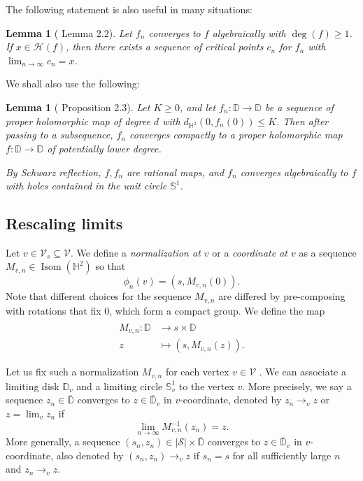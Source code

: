 \documentclass[11pt, reqno]{amsart}
\numberwithin{equation}{section}
\theoremstyle{plain}
\theoremstyle{theorem}
\newtheorem{lem}[theorem]{Lemma}
\theoremstyle{definition}
\newcommand{\Hyp}{\mathbb{H}}
\newcommand{\D}{\mathbb{D}}
\DeclareMathOperator{\Isom}{Isom}
\numberwithin{figure}{section}
\begin{document}
The following statement is also useful in many situations:
\begin{lem}[\cite{Luo21} Lemma 2.2]\label{lem:critc}
Let $f_n$ converges to $f$ algebraically with $\deg(f) \geq 1$.
If $x\in \mathcal{H}(f)$, then there exists a sequence of critical points $c_n$ for $f_n$ with $\lim_{n\to\infty}c_n = x$.
\end{lem}

We shall also use the following:
\begin{lem}[\cite{Luo21} Proposition 2.3]\label{lem:ac1}
Let $K \geq 0$, and let $f_n: \D\longrightarrow \D$ be a sequence of proper holomorphic map of degree $d$ with $d_{\Hyp^2}(0, f_n(0)) \leq K$.
Then after passing to a subsequence, $f_n$ converges compactly to a proper holomorphic map $f: \D \longrightarrow \D$ of potentially lower degree.

By Schwarz reflection, $f, f_n$ are rational maps, and $f_n$ converges algebraically to $f$ with holes contained in the unit circle $\mathbb{S}^1$.
\end{lem}



\subsection*{Rescaling limits}
Let $v \in \mathcal{V}_s \subseteq \mathcal{V}$. 
We define a {\em normalization at $v$} or a {\em coordinate at $v$} as a sequence $M_{v,n}\in \Isom(\Hyp^2)$ so that 
$$
\phi_n(v) = (s, M_{v,n}(0)).
$$
Note that different choices for the sequence $M_{v,n}$ are differed by pre-composing with rotations that fix $0$, which form a compact group.
We define the map 
\begin{align*}
\hat M_{v,n} : \D &\longrightarrow s\times \D\\
z &\mapsto (s, M_{v,n}(z)).
\end{align*}

Let us fix such a normalization $M_{v,n}$ for each vertex $v\in \mathcal{V}$ .
We can associate a limiting disk $\D_v$ and a limiting circle $\mathbb{S}^1_v$ to the vertex $v$.
More precisely, we say a sequence $z_n \in \overline{\D}$ converges to $z\in \overline{\D}_v$ in $v$-coordinate, denoted by $z_n \to_v z$ or $z = \lim_v z_n$ if
$$
\lim_{n\to\infty} M^{-1}_{v,n} (z_n) = z.
$$
More generally, a sequence $(s_n, z_n) \in |\mathcal{S}| \times \overline{\D}$ converges to $z\in \overline{\D}_v$ in $v$-coordinate, also denoted by $(s_n, z_n) \to_v z$ if $s_n = s$ for all sufficiently large $n$ and $z_n \to_v z$.
\end{document}
